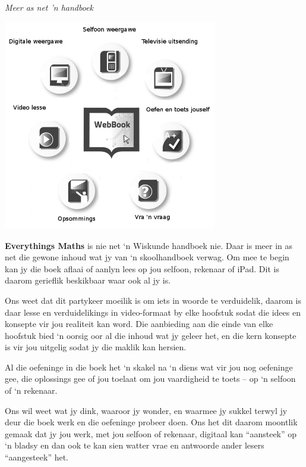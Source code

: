 
\newpage
\thispagestyle{empty}

{\normalfont\sffamily\fontsize{22}\normalfont\itshape Meer as net 'n handboek} \par

\begin{center}
\includegraphics[width=0.70\textwidth]{title_images/morethantextbookAfrikaans.png}
\end{center}

\par
{
\textbf{Everythings Maths} is nie net ‘n Wiskunde handboek nie. Daar is meer in as net die gewone inhoud wat jy van ‘n skoolhandboek verwag. Om mee te begin kan jy die boek aflaai of aanlyn lees op jou selfoon, rekenaar of iPad. Dit is daarom gerieflik beskikbaar waar ook al jy is.\par

Ons weet dat dit partykeer moeilik is om iets in woorde te verduidelik, daarom is daar lesse en verduidelikings in video-formaat by elke hoofstuk sodat die idees en konsepte vir jou realiteit kan word. Die aanbieding aan die einde van elke hoofstuk bied ‘n oorsig oor al die inhoud wat jy geleer het, en die kern konsepte is vir jou uitgelig sodat jy die maklik kan hersien. \par

Al die oefeninge in die boek het ‘n skakel na ‘n diens wat vir jou nog oefeninge gee, die oplossings gee of jou toelaat om jou vaardigheid te toets – op ‘n selfoon of ‘n rekenaar. \par

Ons wil weet wat jy dink, waaroor jy wonder, en waarmee jy sukkel terwyl jy deur die boek werk en die oefeninge probeer doen. Ons het dit daarom moontlik gemaak dat jy jou werk, met jou selfoon of rekenaar, digitaal kan “aansteek” op ‘n bladsy en dan ook te kan sien watter vrae en antwoorde ander lesers “aangesteek” het. \par



}




